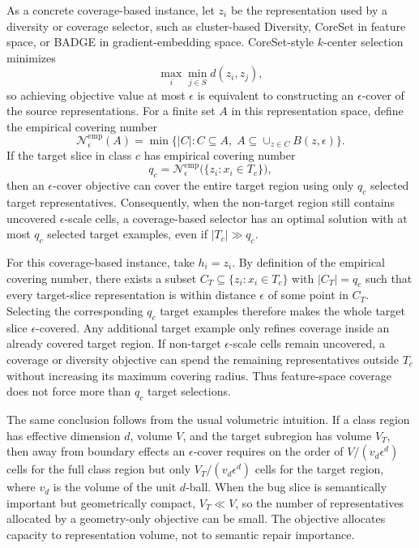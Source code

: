 \documentclass{article}
\begin{document}
As a concrete coverage-based instance, let $z_i$ be the representation used by a diversity or coverage selector, such as cluster-based Diversity, CoreSet in feature space, or BADGE in gradient-embedding space. CoreSet-style $k$-center selection minimizes
\begin{equation}
\label{eq:k-center-objective}
\max_i \min_{j\in S} d(z_i,z_j),
\end{equation}
so achieving objective value at most $\epsilon$ is equivalent to constructing an $\epsilon$-cover of the source representations. For a finite set $A$ in this representation space, define the empirical covering number
\begin{equation}
\label{eq:empirical-covering-number}
\mathcal{N}^{\mathrm{emp}}_{\epsilon}(A)
=
\min\big\{|C|: C\subseteq A,\; A\subseteq \cup_{z\in C}B(z,\epsilon)\big\}.
\end{equation}
If the target slice in class $c$ has empirical covering number
\begin{equation}
\label{eq:target-covering-number}
q_c=\mathcal{N}^{\mathrm{emp}}_{\epsilon}\big(\{z_i:x_i\in T_c\}\big),
\end{equation}
then an $\epsilon$-cover objective can cover the entire target region using only $q_c$ selected target representatives. Consequently, when the non-target region still contains uncovered $\epsilon$-scale cells, a coverage-based selector has an optimal solution with at most $q_c$ selected target examples, even if $|T_c|\gg q_c$.

For this coverage-based instance, take $h_i=z_i$. By definition of the empirical covering number, there exists a subset $C_T\subseteq \{z_i:x_i\in T_c\}$ with $|C_T|=q_c$ such that every target-slice representation is within distance $\epsilon$ of some point in $C_T$. Selecting the corresponding $q_c$ target examples therefore makes the whole target slice $\epsilon$-covered. Any additional target example only refines coverage inside an already covered target region. If non-target $\epsilon$-scale cells remain uncovered, a coverage or diversity objective can spend the remaining representatives outside $T_c$ without increasing its maximum covering radius. Thus feature-space coverage does not force more than $q_c$ target selections.

The same conclusion follows from the usual volumetric intuition. If a class region has effective dimension $d$, volume $V$, and the target subregion has volume $V_T$, then away from boundary effects an $\epsilon$-cover requires on the order of $V/(v_d\epsilon^d)$ cells for the full class region but only $V_T/(v_d\epsilon^d)$ cells for the target region, where $v_d$ is the volume of the unit $d$-ball. When the bug slice is semantically important but geometrically compact, $V_T\ll V$, so the number of representatives allocated by a geometry-only objective can be small. The objective allocates capacity to representation volume, not to semantic repair importance.
\end{document}
